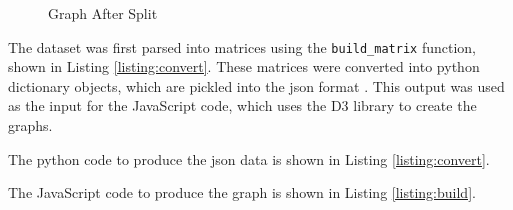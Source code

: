 \begin{figure}[h!]
\centering
{}
\caption{Graph After Split}
\label{fig:split_graph}
\end{figure}

\clearpage

The dataset was first parsed into matrices using the {\tt build\_matrix} function, shown in Listing \ref{listing:convert}. These matrices were converted into python dictionary objects, which are pickled \cite{py:pickle} into the json format \cite{json}. This output was used as the input for the JavaScript code, which uses the D3 library \cite{d3} to create the graphs.

The python code to produce the json data is shown in Listing \ref{listing:convert}.



\clearpage

The JavaScript code to produce the graph is shown in Listing \ref{listing:build}.


